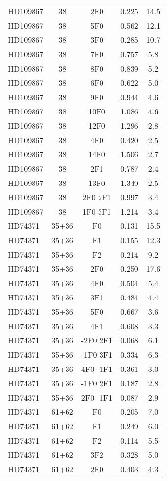 \begin{table*}
\begin{tabular}{l c c c c}
HD109867 & 38 & 2F0 & 0.225 & 14.5\\ 
HD109867 & 38 & 5F0 & 0.562 & 12.1\\ 
HD109867 & 38 & 3F0 & 0.285 & 10.7\\ 
HD109867 & 38 & 7F0 & 0.757 & 5.8\\ 
HD109867 & 38 & 8F0 & 0.839 & 5.2\\ 
HD109867 & 38 & 6F0 & 0.622 & 5.0\\ 
HD109867 & 38 & 9F0 & 0.944 & 4.6\\ 
HD109867 & 38 & 10F0 & 1.086 & 4.6\\ 
HD109867 & 38 & 12F0 & 1.296 & 2.8\\ 
HD109867 & 38 & 4F0 & 0.420 & 2.5\\ 
HD109867 & 38 & 14F0 & 1.506 & 2.7\\ 
HD109867 & 38 & 2F1 & 0.787 & 2.4\\ 
HD109867 & 38 & 13F0 & 1.349 & 2.5\\ 
HD109867 & 38 & 2F0 2F1 & 0.997 & 3.4\\ 
HD109867 & 38 & 1F0 3F1 & 1.214 & 3.4\\ 
\hline
HD74371 & 35+36 & F0 & 0.131 & 15.5\\ 
HD74371 & 35+36 & F1 & 0.155 & 12.3\\ 
HD74371 & 35+36 & F2 & 0.214 & 9.2\\ 
HD74371 & 35+36 & 2F0 & 0.250 & 17.6\\ 
HD74371 & 35+36 & 4F0 & 0.504 & 5.4\\ 
HD74371 & 35+36 & 3F1 & 0.484 & 4.4\\ 
HD74371 & 35+36 & 5F0 & 0.667 & 3.6\\ 
HD74371 & 35+36 & 4F1 & 0.608 & 3.3\\ 
HD74371 & 35+36 & -2F0 2F1 & 0.068 & 6.1\\ 
HD74371 & 35+36 & -1F0 3F1 & 0.334 & 6.3\\ 
HD74371 & 35+36 & 4F0 -1F1 & 0.361 & 3.0\\ 
HD74371 & 35+36 & -1F0 2F1 & 0.187 & 2.8\\ 
HD74371 & 35+36 & 2F0 -1F1 & 0.087 & 2.9\\ 
\hline
HD74371 & 61+62 & F0 & 0.205 & 7.0\\ 
HD74371 & 61+62 & F1 & 0.249 & 6.0\\ 
HD74371 & 61+62 & F2 & 0.114 & 5.5\\ 
HD74371 & 61+62 & 3F2 & 0.328 & 5.0\\ 
HD74371 & 61+62 & 2F0 & 0.403 & 4.3\\ 

\end{tabular}
\end{table*}
